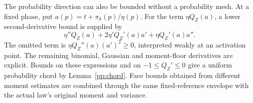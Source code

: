 The probability direction can also be bounded without a probability
mesh. At a fixed phase, put $a(p)=t+\pi_k(p)/\eta(p)$.
For the term $\eta Q_Z(a)$, a lower second-derivative bound is supplied by
\begin{equation}\label{ce:probability-curvature}
 \eta''Q_Z(a)+2\eta'Q_Z'(a)a'+\eta Q_Z'(a)a''.
\end{equation}
The omitted term is $\eta Q_Z''(a)(a')^2\ge0$, interpreted weakly
at an activation point. The remaining binomial, Gaussian and moment-floor
derivatives are explicit. Bounds on these expressions and on
$-1\le Q_Z'\le0$ give a uniform probability chord by
Lemma~\ref{pp:chord}. Face bounds obtained from different moment
estimates are combined through the same fixed-reference envelope with
the actual law's original moment and variance.

